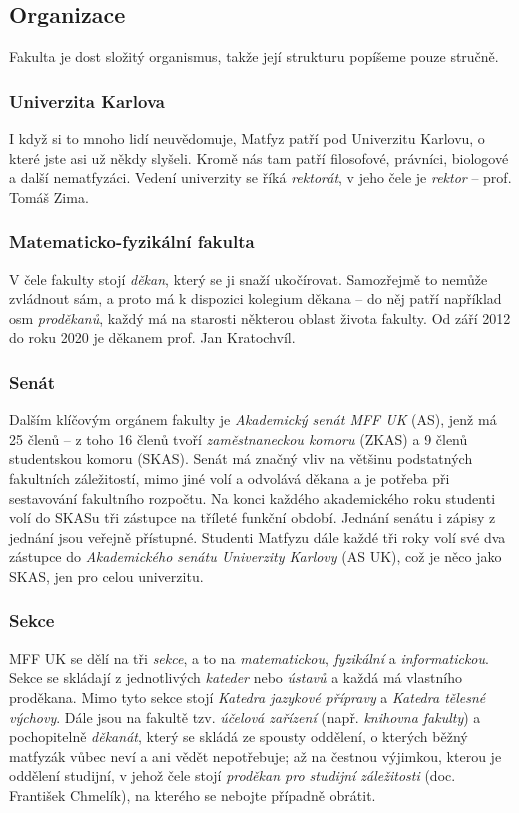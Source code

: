\subsection{Organizace}
Fakulta je dost složitý organismus, takže její strukturu popíšeme pouze stručně.


\subsubsection{Univerzita Karlova}
I když si to mnoho lidí neuvědomuje, Matfyz patří pod Univerzitu Karlovu, o které
jste asi už někdy slyšeli. Kromě nás tam patří filosofové, právníci, biologové a
další nematfyzáci. Vedení univerzity se říká \textit{rektorát}, v jeho čele je
\textit{rektor} -- prof. Tomáš Zima.


\subsubsection{Matematicko-fyzikální fakulta}
V čele fakulty stojí \textit{děkan}, který se ji snaží ukočírovat. Samozřejmě to
nemůže zvládnout sám, a proto má k dispozici kolegium děkana -- do něj patří
například osm \textit{proděkanů}, každý má na starosti některou oblast života
fakulty. Od září 2012 do roku 2020 je děkanem prof. Jan
Kratochvíl.

\subsubsection{Senát}
Dalším klíčovým orgánem fakulty je \textit{Akademický senát MFF UK} (AS), jenž
má 25 členů -- z toho 16 členů tvoří \textit{zaměstnaneckou komoru} (ZKAS) a 9
členů studentskou komoru (SKAS). Senát má značný vliv na většinu podstatných
fakultních záležitostí, mimo jiné volí a odvolává děkana a je potřeba při sestavování fakultního rozpočtu. Na konci každého akademického roku
studenti volí do SKASu tři zástupce na tříleté funkční období. Jednání senátu i
zápisy z jednání jsou veřejně přístupné. Studenti Matfyzu dále každé tři roky
volí své dva zástupce do \textit{Akademického senátu Univerzity Karlovy} (AS
UK), což je něco jako SKAS, jen pro celou univerzitu.


\subsubsection{Sekce}
MFF UK se dělí na tři \textit{sekce}, a to na \textit{matematickou},
\textit{fyzikální} a \textit{informatickou}. Sekce se skládají z jednotlivých
\textit{kateder} nebo \textit{ústavů} a každá má vlastního proděkana. Mimo tyto
sekce stojí \textit{Katedra jazykové přípravy} a \textit{Katedra tělesné výchovy}. Dále jsou na
fakultě tzv. \textit{účelová zařízení} (např. \textit{knihovna fakulty}) a pochopitelně \textit{děkanát},
který se skládá ze spousty oddělení, o kterých běžný matfyzák vůbec neví a ani
vědět nepotřebuje; až na čestnou výjimkou, kterou je oddělení studijní, v jehož
čele stojí \textit{proděkan pro studijní záležitosti} (doc. František Chmelík),
na kterého se nebojte případně obrátit.
